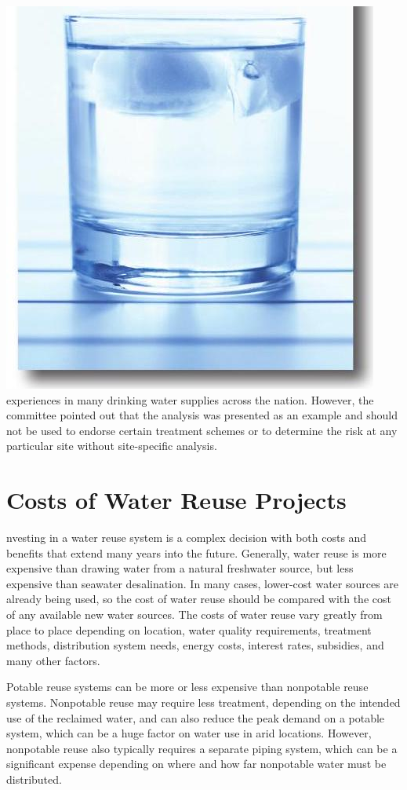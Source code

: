 \documentclass[10pt]{article}
\begin{document}
\includegraphics[max width=\textwidth]{2022_11_05_93277ca2de7ec5580550g-10}\\
experiences in many drinking water supplies across the nation. However, the committee pointed out that the analysis was presented as an example and should not be used to endorse certain treatment schemes or to determine the risk at any particular site without site-specific analysis.

\section{Costs of Water Reuse Projects}
nvesting in a water reuse system is a complex decision with both costs and benefits that extend many years into the future. Generally, water reuse is more expensive than drawing water from a natural freshwater source, but less expensive than seawater desalination. In many cases, lower-cost water sources are already being used, so the cost of water reuse should be compared with the cost of any available new water sources. The costs of water reuse vary greatly from place to place depending on location, water quality requirements, treatment methods, distribution system needs, energy costs, interest rates, subsidies, and many other factors.

Potable reuse systems can be more or less expensive than nonpotable reuse systems. Nonpotable reuse may require less treatment, depending on the intended use of the reclaimed water, and can also reduce the peak demand on a potable system, which can be a huge factor on water use in arid locations. However, nonpotable reuse also typically requires a separate piping system, which can be a significant expense depending on where and how far nonpotable water must be distributed.
\end{document}
